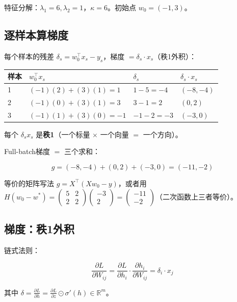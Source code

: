 \documentclass[12pt,a4paper]{article}
\begin{document}
特征分解：$\lambda_1 = 6, \lambda_2 = 1$，$\kappa = 6$。初始点 $w_0 = (-1, 3)$。
 
\subsection{逐样本算梯度}
 
每个样本的残差 $\delta_s = w_0^\top x_s - y_s$，梯度 $= \delta_s \cdot x_s$（秩1外积）：
 
\begin{center}\small
\begin{longtable}{|l|l|l|l|}
\hline
样本 & $w_0^\top x_s$ & $\delta_s$ & $\delta_s \cdot x_s$ \\
\hline
1 & $(-1)(2)+(3)(1) = 1$ & $1-5 = -4$ & $(-8, -4)$ \\
2 & $(-1)(0)+(3)(1) = 3$ & $3-1 = 2$ & $(0, 2)$ \\
3 & $(-1)(1)+(3)(0) = -1$ & $-1-2 = -3$ & $(-3, 0)$ \\
\hline
\end{longtable}
\end{center}
 
每个 $\delta_s x_s$ 是\textbf{秩1}（一个标量 $\times$ 一个向量 $=$ 一个方向）。
 
Full-batch梯度 $=$ 三个求和：
 
\[g = (-8,-4) + (0,2) + (-3,0) = (-11, -2)\]
 
等价的矩阵写法 $g = X^\top(Xw_0 - y)$，或者用 $H(w_0-w^*) = \begin{pmatrix}5&2\\2&2\end{pmatrix}\begin{pmatrix}-3\\2\end{pmatrix} = \begin{pmatrix}-11\\-2\end{pmatrix}$（二次函数上三者等价）。

 
\subsection{梯度：秩1外积}

链式法则：


\[\frac{\partial L}{\partial W_{ij}} = \frac{\partial L}{\partial h_i} \cdot \frac{\partial h_i}{\partial W_{ij}} = \delta_i \cdot x_j\]

其中 $\delta = \frac{\partial L}{\partial h} = \frac{\partial L}{\partial z} \odot \sigma'(h) \in \mathbb{R}^m$。
\end{document}
